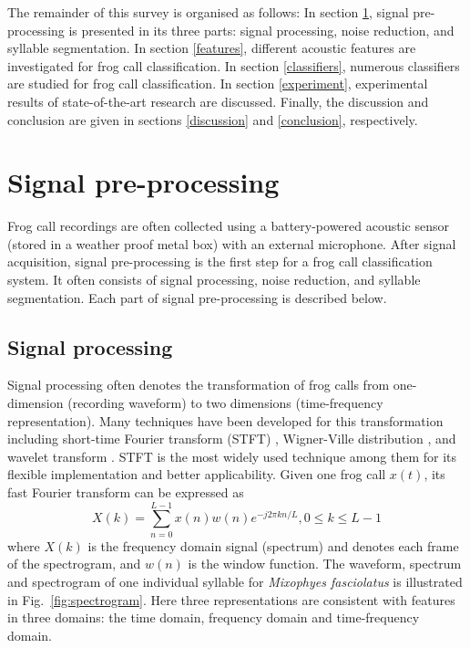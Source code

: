 

The remainder of this survey is organised as follows: In section \ref{pre-processing}, signal pre-processing is presented in its three parts: signal processing, noise reduction, and syllable segmentation. 
In section \ref{features}, different acoustic features are investigated for frog call classification. In section \ref{classifiers}, numerous classifiers are studied for frog call classification. In section \ref{experiment}, experimental results of state-of-the-art research are discussed. Finally, the discussion and conclusion are given in sections \ref{discussion} and \ref{conclusion}, respectively.




\section{Signal pre-processing}
\label{pre-processing}

Frog call recordings are often collected using a battery-powered acoustic sensor (stored in a weather proof metal box) with an external microphone. After signal acquisition,  signal pre-processing is the first step for a frog call classification system.
It often consists of signal processing, noise reduction, and syllable segmentation. Each part of signal pre-processing is described below.


\subsection{Signal processing}
Signal processing often denotes the transformation of frog calls from one-dimension (recording waveform) to two dimensions (time-frequency representation). Many techniques have been developed for this transformation including short-time Fourier transform (STFT) \citep{STFT1977}, Wigner-Ville distribution \citep{WV1987}, and wavelet transform \citep{meyer1995wavelets}. STFT is the most widely used technique among them for its flexible implementation and better applicability. Given one frog call $x(t)$, its fast Fourier transform can be expressed as
\begin{equation}
X(k) = \sum_{n=0}^{L-1}x(n)w(n)e^{-j2 \pi kn/L}, 0 \leq k \leq L-1
\end{equation}
where $X(k)$ is the frequency domain signal (spectrum) and denotes each frame of the spectrogram, and $w(n)$ is the window function. The waveform, spectrum and spectrogram of one individual syllable for \textit{Mixophyes fasciolatus} is illustrated in Fig.~\ref{fig:spectrogram}. Here three representations are consistent with features in three domains: the time domain, frequency domain and time-frequency domain.

